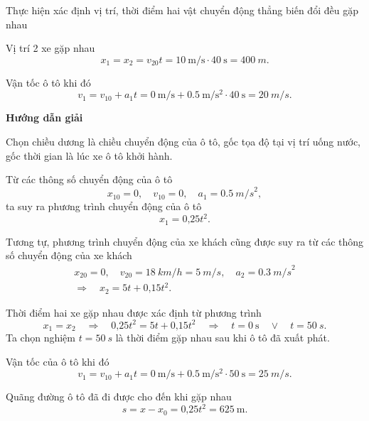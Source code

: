 \begin{dang}{Thực hiện xác định vị trí, thời điểm hai vật chuyển động thẳng biến đổi đều gặp nhau}
{		 	Vị trí 2 xe gặp nhau 
		 	$$x_1=x_2=v_{20}t =\SI{10}{\meter/\second}\cdot\SI{40}{\second}= \SI{400}{m}.$$
		 	 
		 	Vận tốc ô tô khi đó 
		 	$$v_1 = v_{10}+ a_1t = \SI{0}{\meter/\second}+\SI{0.5}{\meter/\second^{2}}\cdot\SI{40}{\second}=\SI{20}{m/s}.$$  
		
	
	}
	{	\begin{center}
			\textbf{Hướng dẫn giải}
		\end{center}
		
		Chọn chiều dương là chiều chuyển động của ô tô, gốc tọa độ tại vị trí uống nước, gốc thời gian là lúc xe ô tô khởi hành.
		
		Từ các thông số chuyển động của ô tô
		$$x_{10} = 0,\quad v_{10} = 0,\quad a_{1} = \SI{0,5}{m/s}^2,$$	
		ta suy ra phương trình chuyển động của ô tô
		$$x_1 = \text{0,25}t^2.$$
		
		Tương tự, phương trình chuyển động của xe khách cũng được suy ra từ các thông số chuyển động của xe khách
			\begin{equation*}
				\begin{gathered}
					x_{20} = 0,\quad v_{20} =\SI{18}{km/h}=\SI{5}{m/s},\quad a_{2} = \SI{0,3}{m/s}^2\\
					\Rightarrow\quad x_2 =5t+\text{0,15}t^2.
				\end{gathered}
			\end{equation*}
		
		Thời điểm hai xe gặp nhau được xác định từ phương trình 
		$$x_1=x_2 \quad\Rightarrow\quad \text{0,25}t^2=5t+\text{0,15}t^2 \quad\Rightarrow\quad t=\SI{0}{\second}\quad\vee\quad t =\SI{50}{s}.$$
		Ta chọn nghiệm $t =\SI{50}{s}$ là thời điểm gặp nhau sau khi ô tô đã xuất phát. 
		
		Vận tốc của ô tô khi đó
		$$v_1 = v_{10}+ a_1t = \SI{0}{\meter/\second}+\SI{0.5}{\meter/\second^{2}}\cdot\SI{50}{\second}=\SI{25}{m/s}.$$  
		
		Quãng đường ô tô đã đi được cho đến khi gặp nhau 
		$$s=x-x_0 =\text{0,25}t^2 = \SI{625}{\meter}.$$	
	}
\end{dang}
